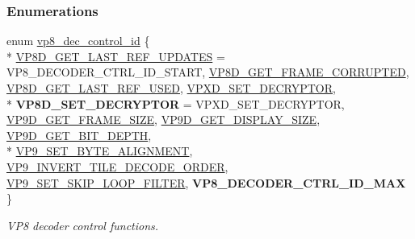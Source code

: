 \subsubsection*{Enumerations}
\begin{DoxyCompactItemize}
\item 
enum \hyperlink{group__vp8__decoder_gaf9dd3f2e6d1412106ee791af768e57c1}{vp8\+\_\+dec\+\_\+control\+\_\+id} \{ \\*
\hyperlink{group__vp8__decoder_ggaf9dd3f2e6d1412106ee791af768e57c1a0b6055c47120f28e3de959960ee0a02b}{V\+P8\+D\+\_\+\+G\+E\+T\+\_\+\+L\+A\+S\+T\+\_\+\+R\+E\+F\+\_\+\+U\+P\+D\+A\+T\+ES} = V\+P8\+\_\+\+D\+E\+C\+O\+D\+E\+R\+\_\+\+C\+T\+R\+L\+\_\+\+I\+D\+\_\+\+S\+T\+A\+RT, 
\hyperlink{group__vp8__decoder_ggaf9dd3f2e6d1412106ee791af768e57c1af9f82d9e7930e6a2244b30b031b79599}{V\+P8\+D\+\_\+\+G\+E\+T\+\_\+\+F\+R\+A\+M\+E\+\_\+\+C\+O\+R\+R\+U\+P\+T\+ED}, 
\hyperlink{group__vp8__decoder_ggaf9dd3f2e6d1412106ee791af768e57c1aa57d870ac8cf395fdc86da4a8939b10b}{V\+P8\+D\+\_\+\+G\+E\+T\+\_\+\+L\+A\+S\+T\+\_\+\+R\+E\+F\+\_\+\+U\+S\+ED}, 
\hyperlink{group__vp8__decoder_ggaf9dd3f2e6d1412106ee791af768e57c1a7fbdffa6018163d0ecf12b50276beba0}{V\+P\+X\+D\+\_\+\+S\+E\+T\+\_\+\+D\+E\+C\+R\+Y\+P\+T\+OR}, 
\\*
{\bfseries V\+P8\+D\+\_\+\+S\+E\+T\+\_\+\+D\+E\+C\+R\+Y\+P\+T\+OR} = V\+P\+X\+D\+\_\+\+S\+E\+T\+\_\+\+D\+E\+C\+R\+Y\+P\+T\+OR, 
\hyperlink{group__vp8__decoder_ggaf9dd3f2e6d1412106ee791af768e57c1a7a8d537472fc7561bd86c7395994ba37}{V\+P9\+D\+\_\+\+G\+E\+T\+\_\+\+F\+R\+A\+M\+E\+\_\+\+S\+I\+ZE}, 
\hyperlink{group__vp8__decoder_ggaf9dd3f2e6d1412106ee791af768e57c1aec6eaaa866488cfe1d0cb83cab302ebd}{V\+P9\+D\+\_\+\+G\+E\+T\+\_\+\+D\+I\+S\+P\+L\+A\+Y\+\_\+\+S\+I\+ZE}, 
\hyperlink{group__vp8__decoder_ggaf9dd3f2e6d1412106ee791af768e57c1a0c0d6174e3dd0ae615913d940a2bbdeb}{V\+P9\+D\+\_\+\+G\+E\+T\+\_\+\+B\+I\+T\+\_\+\+D\+E\+P\+TH}, 
\\*
\hyperlink{group__vp8__decoder_ggaf9dd3f2e6d1412106ee791af768e57c1a5a045a5e858c7641aea8987fed5e24b4}{V\+P9\+\_\+\+S\+E\+T\+\_\+\+B\+Y\+T\+E\+\_\+\+A\+L\+I\+G\+N\+M\+E\+NT}, 
\hyperlink{group__vp8__decoder_ggaf9dd3f2e6d1412106ee791af768e57c1a1c4fc468749a2ef88e148f09210ce73c}{V\+P9\+\_\+\+I\+N\+V\+E\+R\+T\+\_\+\+T\+I\+L\+E\+\_\+\+D\+E\+C\+O\+D\+E\+\_\+\+O\+R\+D\+ER}, 
\hyperlink{group__vp8__decoder_ggaf9dd3f2e6d1412106ee791af768e57c1a999ed127a9ddb4be322a5a93eaed1233}{V\+P9\+\_\+\+S\+E\+T\+\_\+\+S\+K\+I\+P\+\_\+\+L\+O\+O\+P\+\_\+\+F\+I\+L\+T\+ER}, 
{\bfseries V\+P8\+\_\+\+D\+E\+C\+O\+D\+E\+R\+\_\+\+C\+T\+R\+L\+\_\+\+I\+D\+\_\+\+M\+AX}
 \}\begin{DoxyCompactList}\small\item\em V\+P8 decoder control functions. \end{DoxyCompactList}
\end{DoxyCompactItemize}
